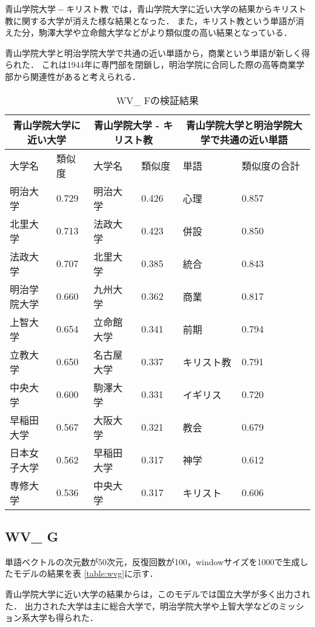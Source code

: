 $ 青山学院大学 - キリスト教 $ では，青山学院大学に近い大学の結果からキリスト教に関する大学が消えた様な結果となった．
また，キリスト教という単語が消えた分，駒澤大学や立命館大学などがより類似度の高い結果となっている．

青山学院大学と明治学院大学で共通の近い単語から，商業という単語が新しく得られた．
これは1944年に専門部を閉鎖し，明治学院に合同した際の高等商業学部から関連性があると考えられる．

\begin{table}[H]
\caption{WV\_ Fの検証結果}
\centering
\footnotesize
\begin{tabular}{ll|ll|ll}
\hline
\multicolumn{2}{c}{青山学院大学に近い大学} & \multicolumn{2}{c}{青山学院大学 - キリスト教} & \multicolumn{2}{c}{青山学院大学と明治学院大学で共通の近い単語}
\\ \hline
大学名 & 類似度 & 大学名 & 類似度 & 単語 & 類似度の合計
\\ \hline \hline
明治大学 & 0.729 & 明治大学 & 0.426 & 心理 & 0.857\\
北里大学 & 0.713 & 法政大学 & 0.423 & 併設 & 0.850\\
法政大学 & 0.707 & 北里大学 & 0.385 & 統合 & 0.843\\
明治学院大学 & 0.660 & 九州大学 & 0.362 & 商業 & 0.817\\
上智大学 & 0.654 & 立命館大学 & 0.341 & 前期 & 0.794\\
立教大学 & 0.650 & 名古屋大学 & 0.337 & キリスト教 & 0.791\\
中央大学 & 0.600 & 駒澤大学 & 0.331 & イギリス & 0.720\\
早稲田大学 & 0.567 & 大阪大学 & 0.321 & 教会 & 0.679\\
日本女子大学 & 0.562 & 早稲田大学 & 0.317 & 神学 & 0.612\\
専修大学 & 0.536 & 中央大学 & 0.317 & キリスト & 0.606\\ \hline
\end{tabular}
\label{table:wvf}
\end{table}


\subsection{WV\_ G}
単語ベクトルの次元数が50次元，反復回数が100，windowサイズを1000で生成したモデルの結果を表 \ref{table:wvg}に示す．

青山学院大学に近い大学の結果からは，このモデルでは国立大学が多く出力された．
出力された大学は主に総合大学で，明治学院大学や上智大学などのミッション系大学も得られた．

